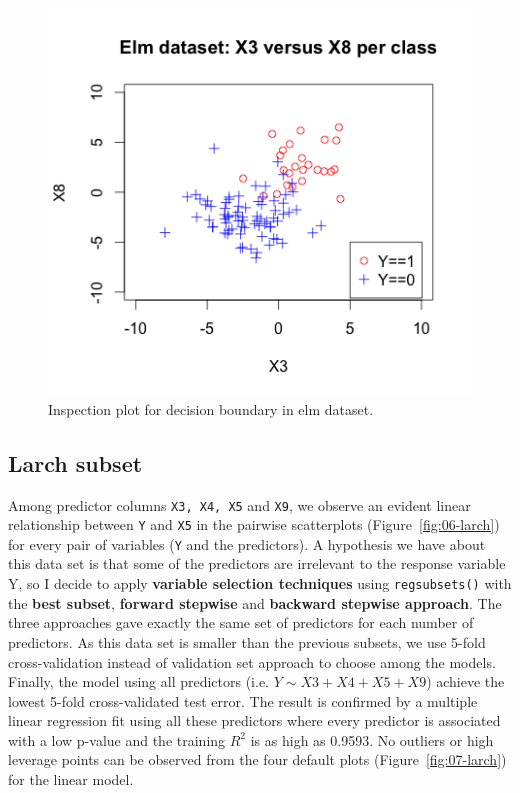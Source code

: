 \documentclass{article}
\begin{document}
\begin{figure}[h!]
  \includegraphics[width=\linewidth]{project/images/05-elm.png}
  \caption{Inspection plot for decision boundary in elm dataset.}
  \label{fig:05-elm}
\end{figure}

\subsection{Larch subset}

Among predictor columns {\tt X3, X4, X5} and {\tt X9}, we observe an evident linear relationship between {\tt Y} and {\tt X5} in the pairwise scatterplots (Figure~\ref{fig:06-larch}) for every pair of variables ({\tt Y} and the predictors). A hypothesis we have about this data set is that some of the predictors are irrelevant to the response variable Y, so I decide to apply \textbf{variable selection techniques} using {\tt regsubsets()} with the \textbf{best subset}, \textbf{forward stepwise} and \textbf{backward stepwise approach}. The three approaches gave exactly the same set of predictors for each number of predictors. As this data set is smaller than the previous subsets, we use 5-fold cross-validation instead of validation set approach to choose among the models. Finally, the model using all predictors (i.e. $Y \sim X3+X4+X5+X9$) achieve the lowest 5-fold cross-validated test error. The result is confirmed by a multiple linear regression fit using all these predictors where every predictor is associated with a low p-value and the training $R^2$ is as high as 0.9593. No outliers or high leverage points can be observed from the four default plots (Figure~\ref{fig:07-larch}) for the linear model.
\end{document}
